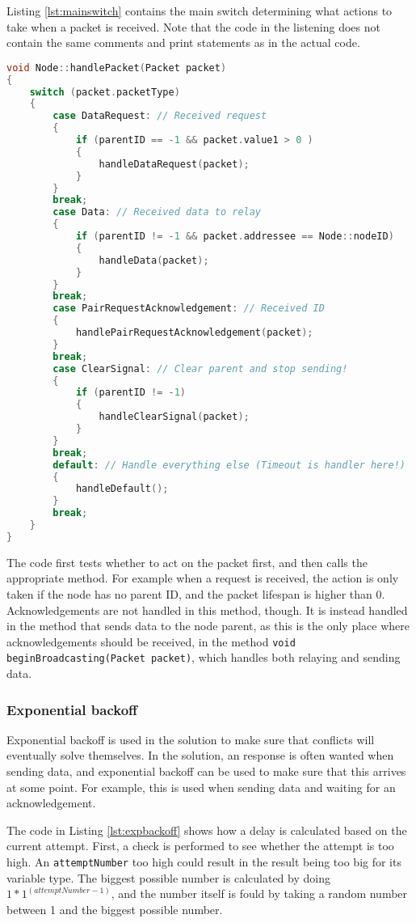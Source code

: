 Listing \ref{lst:mainswitch} contains the main switch determining what actions to take when a packet is received. Note that the code in the listening does not contain the same comments and print statements as in the actual code.
\begin{lstlisting}[language=C,caption={The packet handling method.},label={lst:mainswitch}]
void Node::handlePacket(Packet packet)
{
    switch (packet.packetType)
    {
        case DataRequest: // Received request
        {
            if (parentID == -1 && packet.value1 > 0 )
            {
                handleDataRequest(packet);
            }
        }
        break;
        case Data: // Received data to relay
        {
            if (parentID != -1 && packet.addressee == Node::nodeID)
            {
                handleData(packet);
            }
        }
        break;
        case PairRequestAcknowledgement: // Received ID
        {
            handlePairRequestAcknowledgement(packet);
        }
        break;
        case ClearSignal: // Clear parent and stop sending!
        {
            if (parentID != -1)
            {
                handleClearSignal(packet);
            }
        }
        break;
        default: // Handle everything else (Timeout is handler here!)
        {
            handleDefault();
        }
        break;
    }
}
\end{lstlisting}
The code first tests whether to act on the packet first, and then calls the appropriate method. For example when a request is received, the action is only taken if the node has no parent ID, and the packet lifespan is higher than 0. Acknowledgements are not handled in this method, though. It is instead handled in the method that sends data to the node parent, as this is the only place where acknowledgements should be received, in the method \texttt{void beginBroadcasting(Packet packet)}, which handles both relaying and sending data.


\subsubsection*{Exponential backoff}
Exponential backoff is used in the solution to make sure that conflicts will eventually solve themselves. In the solution, an response is often wanted when sending data, and exponential backoff can be used to make sure that this arrives at some point. For example, this is used when sending data and waiting for an acknowledgement.

The code in Listing \ref{lst:expbackoff} shows how a delay is calculated based on the current attempt. First, a check is performed to see whether the attempt is too high. An \texttt{attemptNumber} too high could result in the result being too big for its variable type. 
The biggest possible number is calculated by doing $1 * 1^(attemptNumber-1)$, and the number itself is fould by taking a random number between 1 and the biggest possible number.

